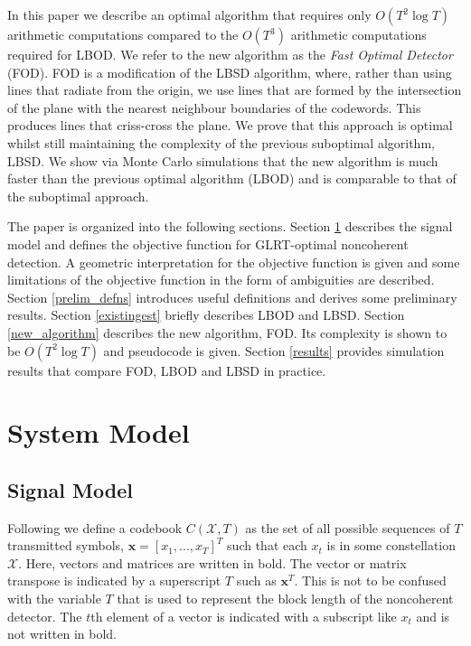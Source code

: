 \documentclass[conference]{IEEEtran}
\begin{document}
In this paper we describe an optimal algorithm that requires only $O(T^2 \log{T})$ arithmetic computations compared to the $O(T^3)$ arithmetic computations required for LBOD.  We refer to the new algorithm as the \emph{Fast Optimal Detector} (FOD).  FOD is a modification of the LBSD algorithm, where, rather than using lines that radiate from the origin, we use lines that are formed by the intersection of the plane with the nearest neighbour boundaries of the codewords.  This produces lines that criss-cross the plane.  We prove that this approach is optimal whilst still maintaining the complexity of the previous suboptimal algorithm, LBSD. We show via Monte Carlo simulations that the new algorithm is much faster than the previous optimal algorithm (LBOD) and is comparable to that of the suboptimal approach.

The paper is organized into the following sections. Section \ref{system_model} describes the signal model and defines the objective function for GLRT-optimal noncoherent detection.  A geometric interpretation for the objective function is given and some limitations of the objective function in the form of ambiguities are described. Section \ref{prelim_defns} introduces useful definitions and derives some preliminary results. Section \ref{existingest} briefly describes LBOD and LBSD. Section \ref{new_algorithm} describes the new algorithm, FOD.  Its complexity is shown to be $O(T^2\log{T})$ and pseudocode is given. Section \ref{results} provides simulation results that compare FOD, LBOD and LBSD in practice.

\section{System Model} \label{system_model}

\subsection{Signal Model} \label{signal_model}
Following \cite{Ryan2007} we define a codebook $C(\mathcal{X}, T )$ as the set of all possible sequences of $T$ transmitted symbols, $\bm{x} = [x_1, . . . , x_T ]^T$ such that each $x_t$ is in some constellation $\mathcal{X}$.  Here, vectors and matrices are written in bold. The vector or matrix transpose is indicated by a superscript $T$ such as $\bm{x}^T$.  This is not to be confused with the variable $T$ that is used to represent the block length of the noncoherent detector.  The $t$th element of a vector is indicated with a subscript like $x_t$ and is not written in bold.
\end{document}
